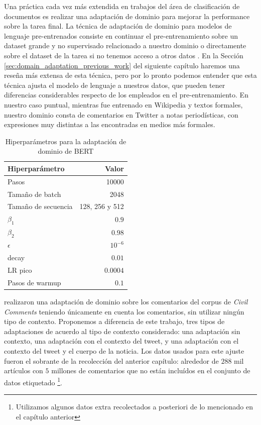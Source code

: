 Una práctica cada vez más extendida en trabajos del área de clasificación de documentos es realizar una adaptación de dominio para mejorar la performance sobre la tarea final. La técnica de adaptación de dominio para modelos de lenguaje pre-entrenados consiste en continuar el pre-entrenamiento sobre un dataset grande y no supervisado relacionado a nuestro dominio o directamente sobre el dataset de la tarea si no tenemos acceso a otros datos \cite{gururangan-etal-2020-dont}. En la Sección \ref{sec:domain_adaptation_previous_work} del siguiente capítulo haremos una reseña más extensa de esta técnica, pero por lo pronto podemos entender que esta técnica ajusta el modelo de lenguaje a nuestros datos, que pueden tener diferencias considerables respecto de los empleados en el pre-entrenamiento. En nuestro caso puntual, mientras \beto{} fue entrenado en Wikipedia y textos formales, nuestro dominio consta de comentarios en Twitter a notas periodísticas, con expresiones muy distintas a las encontradas en medios más formales.

\begin{table}[t]
    \centering
    \begin{tabular}{lr}
        \toprule
        Hiperparámetro & Valor         \\
        \midrule
        Pasos               & \num{10000}           \\
        Tamaño de batch     & \num{2048}            \\
        Tamaño de secuencia & 128, 256 y 512  \\
        $\beta_1$           & $0.9$           \\
        $\beta_2$           & $0.98$          \\
        $\epsilon$          & $10^{-6}$       \\
        decay               & $0.01$          \\
        LR pico             & $0.0004$     \\
        Pasos de warmup     & $0.1$             \\
        \bottomrule
    \end{tabular}
    \caption{Hiperparámetros para la adaptación de dominio de BERT}
    \label{tab:hs_ft_hyperparameter}
\end{table}


\citet{pavlopoulos2020toxicity} realizaron una adaptación de dominio sobre los comentarios del corpus de \emph{Civil Comments} teniendo únicamente en cuenta los comentarios, sin utilizar ningún tipo de contexto. Proponemos a diferencia de este trabajo, tres tipos de adaptaciones de acuerdo al tipo de contexto considerado: una adaptación sin contexto, una adaptación con el contexto del tweet, y una adaptación con el contexto del tweet y el cuerpo de la noticia. Los datos usados para este ajuste fueron el sobrante de la recolección del anterior capítulo: alrededor de $288$ mil artículos con $5$ millones de comentarios que no están incluídos en el conjunto de datos etiquetado \footnote{Utilizamos algunos datos extra recolectados a posteriori de lo mencionado en el capítulo anterior}.



